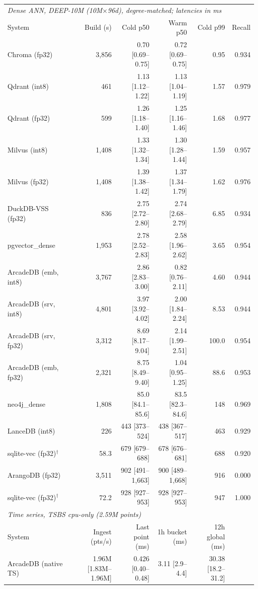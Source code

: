 \begin{tabular}{lrrrrr}
\toprule
\multicolumn{6}{l}{\textit{Dense ANN, DEEP-10M (10M$\times$96d), degree-matched; latencies in ms}} \\
System & Build (s) & Cold p50 & Warm p50 & Cold p99 & Recall \\
\midrule
Chroma (fp32) & 3{,}856 & 0.70 [0.69--0.75] & 0.72 [0.69--0.75] & 0.95 & 0.934 \\
Qdrant (int8) & 461 & 1.13 [1.12--1.22] & 1.13 [1.04--1.19] & 1.57 & 0.979 \\
Qdrant (fp32) & 599 & 1.26 [1.18--1.40] & 1.25 [1.16--1.46] & 1.68 & 0.977 \\
Milvus (int8) & 1{,}408 & 1.33 [1.32--1.34] & 1.30 [1.28--1.44] & 1.59 & 0.957 \\
Milvus (fp32) & 1{,}408 & 1.39 [1.38--1.42] & 1.37 [1.34--1.79] & 1.62 & 0.976 \\
DuckDB-VSS (fp32) & 836 & 2.75 [2.72--2.80] & 2.74 [2.68--2.79] & 6.85 & 0.934 \\
pgvector_dense & 1{,}953 & 2.78 [2.52--2.83] & 2.58 [1.96--2.62] & 3.65 & 0.954 \\
ArcadeDB (emb, int8) & 3{,}767 & 2.86 [2.83--3.00] & 0.82 [0.76--2.11] & 4.60 & 0.944 \\
ArcadeDB (srv, int8) & 4{,}801 & 3.97 [3.92--4.02] & 2.00 [1.84--2.24] & 8.53 & 0.944 \\
ArcadeDB (srv, fp32) & 3{,}312 & 8.69 [8.17--9.04] & 2.14 [1.99--2.51] & 100.0 & 0.954 \\
ArcadeDB (emb, fp32) & 2{,}321 & 8.75 [8.49--9.40] & 1.04 [0.95--1.25] & 88.6 & 0.953 \\
neo4j_dense & 1{,}808 & 85.0 [84.1--85.6] & 83.5 [82.3--84.6] & 148 & 0.969 \\
LanceDB (int8) & 226 & 443 [373--524] & 438 [367--517] & 463 & 0.929 \\
sqlite-vec (fp32)$^{\dagger}$ & 58.3 & 679 [679--688] & 678 [676--681] & 688 & 0.920 \\
ArangoDB (fp32) & 3{,}511 & 902 [491--1{,}663] & 900 [489--1{,}668] & 916 & 0.000 \\
sqlite-vec (fp32)$^{\dagger}$ & 72.2 & 928 [927--953] & 928 [927--953] & 947 & 1.000 \\
\midrule
\multicolumn{6}{l}{\textit{Time series, TSBS cpu-only (2.59M points)}} \\
System & Ingest (pts/s) & Last point (ms) & 1h bucket (ms) & 12h global (ms) & \\
\midrule
ArcadeDB (native TS) & 1.96M [1.83M--1.96M] & 0.426 [0.40--0.48] & 3.11 [2.9--4.4] & 30.38 [18.2--31.2] & \\

\end{tabular}
